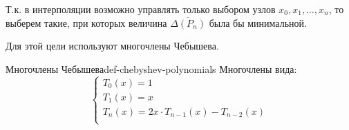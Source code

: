\documentclass[14pt]{extarticle}
\begin{document}
    \vspace{\baselineskip}

    Т.к. в интерполяции возможно управлять только выбором узлов $x_{0}, x_{1}, \ldots, x_{n}$, то выберем такие, при которых величина $\overline{\Delta(P_{n})}$ была бы минимальной.
    
    \vspace{\baselineskip}
    
    Для этой цели используют многочлены Чебышева.

    \begin{definition}{Многочлены Чебышева}{def-chebyshev-polynomials}
        Многочлены вида:
        $$
        \begin{cases}
            T_{0}(x) = 1\\
            T_{1}(x) = x\\
            T_{n}(x) = 2x \cdot T_{n - 1}(x) - T_{n - 2}(x)\\
        \end{cases}
        $$
    \end{definition}
\end{document}
